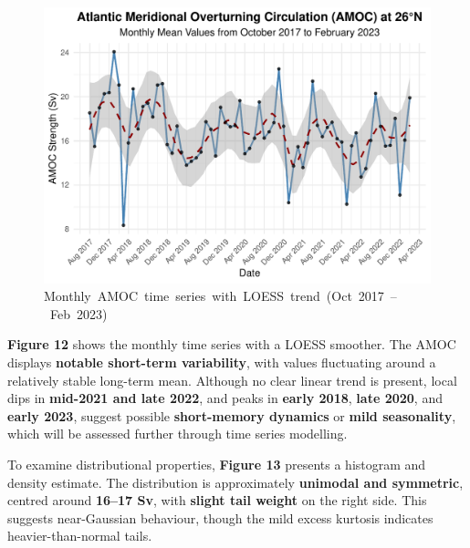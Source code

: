 \documentclass[
  11pt,
]{article}
\begin{document}
\begin{figure}[H]

{\centering \includegraphics{project_files/figure-pdf/fig-monthly amoc-1.pdf}

}

\caption{Monthly~AMOC~time~series~with~LOESS~trend~(Oct~2017~--~Feb~2023)}

\end{figure}%

\textbf{Figure 12} shows the monthly time series with a LOESS smoother.
The AMOC displays \textbf{notable short-term variability}, with values
fluctuating around a relatively stable long-term mean. Although no clear
linear trend is present, local dips in \textbf{mid-2021 and late 2022},
and peaks in \textbf{early 2018}, \textbf{late 2020}, and \textbf{early
2023}, suggest possible \textbf{short-memory dynamics} or \textbf{mild
seasonality}, which will be assessed further through time series
modelling.

To examine distributional properties, \textbf{Figure 13} presents a
histogram and density estimate. The distribution is approximately
\textbf{unimodal and symmetric}, centred around \textbf{16--17 Sv}, with
\textbf{slight tail weight} on the right side. This suggests
near-Gaussian behaviour, though the mild excess kurtosis indicates
heavier-than-normal tails.
\end{document}
